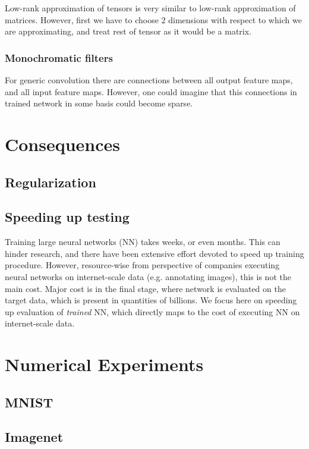\documentclass{article}
\begin{document}
Low-rank approximation of tensors is very similar to low-rank approximation of matrices.
However, first we have to choose $2$ dimensions with respect to which we are approximating, and treat
rest of tensor as it would be a matrix. 

\subsubsection{Monochromatic filters}
For generic convolution there are connections between all output feature maps, and all input feature maps.
However, one could imagine that this connections in trained network in some basis could become sparse. 

\section{Consequences}

\subsection{Regularization}

\subsection{Speeding up testing}
Training large neural networks (NN) takes weeks, or even months. This can hinder 
research, and there have been extensive effort devoted to speed up training procedure.
However, resource-wise from perspective of companies executing neural networks on internet-scale
data (e.g. annotating images), this is not the main cost. Major cost is in the 
final stage, where network is evaluated on the target data, which is present in quantities of billions.
We focus here on speeding up evaluation of \emph{trained} NN, which directly
maps to the cost of executing NN on internet-scale data. 


\section{Numerical Experiments}

\subsection{MNIST}

\subsection{Imagenet}
\end{document}
